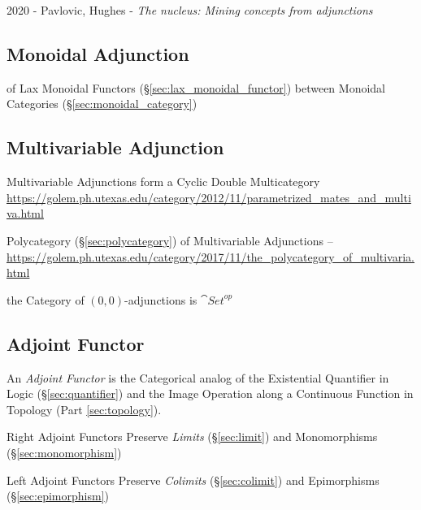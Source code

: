 2020 - Pavlovic, Hughes - \emph{The nucleus: Mining concepts from adjunctions}



\subsection{Monoidal Adjunction}\label{sec:monoidal_adjunction}

of Lax Monoidal Functors (\S\ref{sec:lax_monoidal_functor}) between Monoidal
Categories (\S\ref{sec:monoidal_category})



\subsection{Multivariable Adjunction}\label{sec:multivariable_adjunction}

Multivariable Adjunctions form a Cyclic Double Multicategory
\url{https://golem.ph.utexas.edu/category/2012/11/parametrized_mates_and_multiva.html}

Polycategory (\S\ref{sec:polycategory}) of Multivariable Adjunctions --
\url{https://golem.ph.utexas.edu/category/2017/11/the_polycategory_of_multivaria.html}

the Category of $(0,0)$-adjunctions is $\cat{Set}^{op}$



\subsection{Adjoint Functor}\label{sec:adjoint_functor}

An \emph{Adjoint Functor} is the Categorical analog of the Existential
Quantifier in Logic (\S\ref{sec:quantifier}) and the Image Operation
along a Continuous Function in Topology (Part \ref{sec:topology}).

Right Adjoint Functors Preserve \emph{Limits} (\S\ref{sec:limit}) and
Monomorphisms (\S\ref{sec:monomorphism})

Left Adjoint Functors Preserve \emph{Colimits} (\S\ref{sec:colimit}) and
Epimorphisms (\S\ref{sec:epimorphism})

